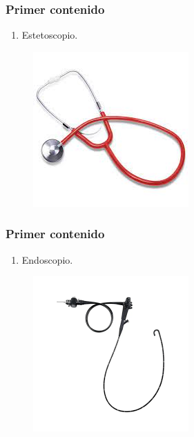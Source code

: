\documentclass[14pt]{beamer}
\begin{document}
\begin{frame}
\frametitle{Primer contenido}
\vspace*{-1cm}
\begin{enumerate}[<+->]
\item Estetoscopio.
\seti
\end{enumerate}
\begin{figure}
    \centering
    \includegraphics[scale=0.6]{Imagenes/Instrumentacion_01.jpg}
\end{figure}
\end{frame}
\begin{frame}
\frametitle{Primer contenido}
\vspace*{-1cm}
\begin{enumerate}[<+->]
\conti
\item Endoscopio.
\seti
\end{enumerate}
\begin{figure}
    \centering
    \includegraphics[scale=0.6]{Imagenes/Instrumentacion_02.png}
\end{figure}
\end{frame}
\end{document}
